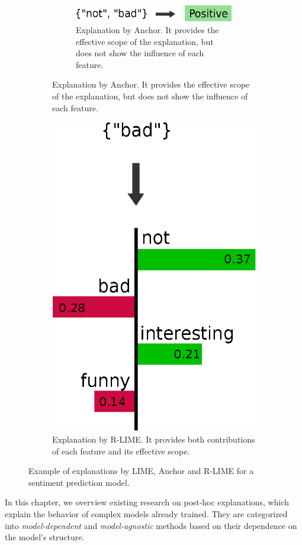 \documentclass[runningheads]{llncs}
\begin{document}
\begin{figure}[t]
\begin{subfigure}[t]{0.45\textwidth}
\begin{subfigure}[t]{\textwidth}
			\centering
			\includegraphics[scale=0.35]{example-anchor}
			\caption{%
				Explanation by Anchor.
				It provides the effective scope of the explanation,
				but does not show the influence of each feature.
			}\label{fig:example-anchor}
		\end{subfigure}
	\end{subfigure}
	\hspace{0.3cm}
	\begin{subfigure}[t]{0.45\textwidth}
		\centering
		\vspace{-1.96cm}
		\includegraphics[scale=0.35]{example-rlime}
		\caption{%
			Explanation by R-LIME\@.
			It provides both contributions of each feature and
			its effective scope.
		}\label{fig:example-rlime}
	\end{subfigure}
	\caption{%
		Example of explanations by LIME, Anchor and R-LIME
		for a sentiment prediction model.
	}\label{fig:example}
\end{figure}
In this chapter,
we overview existing research on post-hoc explanations,
which explain the behavior of complex models already trained.
They are categorized
into \emph{model-dependent} and \emph{model-agnostic} methods
based on their dependence on the model's structure.
\end{document}
